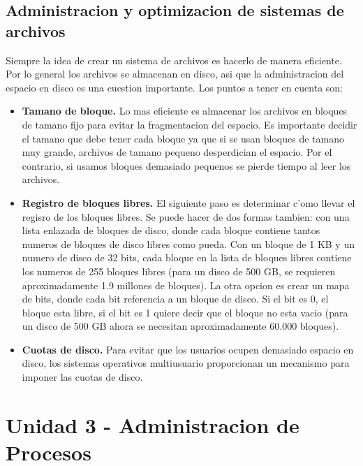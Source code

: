 \documentclass[12pt]{article}
\begin{document}
  \subsection{Administracion y optimizacion de sistemas de archivos}
  Siempre la idea de crear un sistema de archivos es hacerlo de manera eficiente. Por lo general los archivos se almacenan en disco, asi que la administracion del espacio en disco es una cuestion importante. Los puntos a tener en cuenta son:
  \begin{itemize}
    \item \textbf{Tamano de bloque.} Lo mas eficiente es almacenar los archivos en bloques de tamano fijo para evitar la fragmentacion del espacio. Es importante decidir el tamano que debe tener cada bloque ya que si se usan bloques de tamano muy grande, archivos de tamano pequeno desperdician el espacio. Por el contrario, si usamos bloques demasiado pequenos se pierde tiempo al leer los archivos.

    \item \textbf{Registro de bloques libres.} El siguiente paso es determinar c'omo llevar el regisro de los bloques libres. Se puede hacer de dos formas tambien: con una lista enlazada de bloques de disco, donde cada bloque contiene tantos numeros de bloques de disco libres como pueda. Con un bloque de 1 KB y un numero de disco de 32 bits, cada bloque en la lista de bloques libres contiene los numeros de 255 bloques libres (para un disco de 500 GB, se requieren aproximadamente 1.9 millones de bloques). La otra opcion es crear un mapa de bits, donde cada bit referencia a un bloque de disco. Si el bit es 0, el bloque esta libre, si el bit es 1 quiere decir que el bloque no esta vacio (para un disco de 500 GB ahora se necesitan aproximadamente 60.000 bloques).

    \item \textbf{Cuotas de disco.} Para evitar que los usuarios ocupen demasiado espacio en disco, los sistemas operativos multiusuario proporcionan un mecanismo para imponer las cuotas de disco.
  \end{itemize}

  \section{Unidad 3 - Administracion de Procesos}
\end{document}
